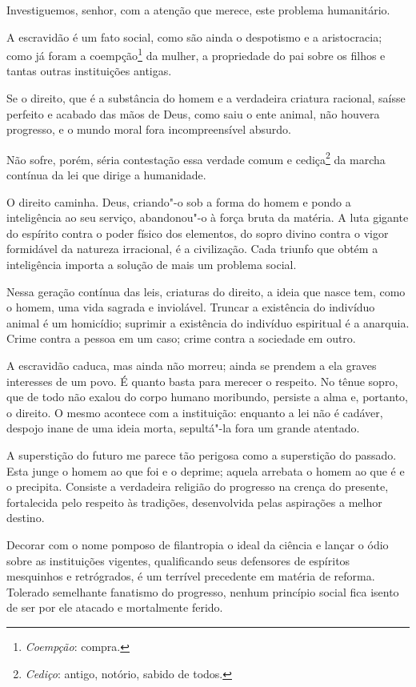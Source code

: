 \sectionitem

Investiguemos, senhor, com a atenção que merece, este problema humanitário.

A escravidão é um fato social, como são ainda o despotismo e a
aristocracia; como já foram a coempção\footnote{ \textit{Coempção}: compra.}
 da mulher, a propriedade do pai sobre os filhos e tantas outras
instituições antigas.

Se o direito, que é a substância do homem e a verdadeira criatura
racional, saísse perfeito e acabado das mãos de Deus, como saiu o ente
animal, não houvera progresso, e o mundo moral fora incompreensível absurdo. 

Não sofre, porém, séria contestação essa verdade comum e
cediça\footnote{ \textit{Cediço}: antigo, notório, sabido de todos.}
 da marcha contínua da lei que dirige a humanidade. 

O direito caminha. Deus, criando"-o sob a forma do homem e pondo a
inteligência ao seu serviço, abandonou"-o à força bruta da matéria. A
luta gigante do espírito contra o poder físico dos elementos, do sopro
divino contra o vigor formidável da natureza irracional, é a
civilização. Cada triunfo que obtém a inteligência importa a solução de
mais um problema social.

Nessa geração contínua das leis, criaturas do direito, a ideia que nasce
tem, como o homem, uma vida sagrada e inviolável. Truncar a existência
do indivíduo animal é um homicídio; suprimir a existência do indivíduo
espiritual é a anarquia. Crime contra a pessoa em um caso; crime contra
a sociedade em outro.

A escravidão caduca, mas ainda não morreu; ainda se prendem a ela graves
interesses de um povo. É quanto basta para merecer o respeito. No tênue
sopro, que de todo não exalou do corpo humano moribundo, persiste a
alma e, portanto, o direito. O mesmo acontece com a instituição:
enquanto a lei não é cadáver, despojo inane de uma ideia morta,
sepultá"-la fora um grande atentado.

A superstição do futuro me parece tão perigosa como a superstição do
passado. Esta junge o homem ao que foi e o deprime; aquela arrebata o
homem ao que é e o precipita. Consiste a verdadeira religião do
progresso na crença do presente, fortalecida pelo respeito às
tradições, desenvolvida pelas aspirações a melhor destino. 

Decorar com o nome pomposo de filantropia o ideal da ciência e lançar o
ódio sobre as instituições vigentes, qualificando seus defensores de
espíritos mesquinhos e retrógrados, é um terrível precedente em matéria
de reforma. Tolerado semelhante fanatismo do progresso, nenhum
princípio social fica isento de ser por ele atacado e mortalmente ferido.


